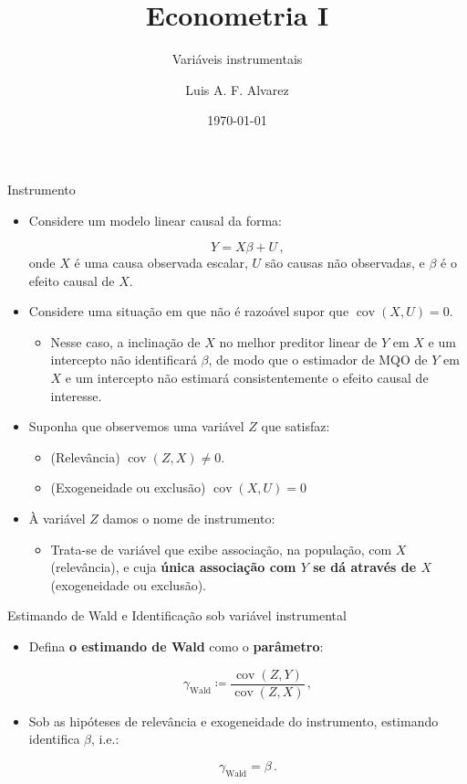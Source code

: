 \documentclass[11pt]{beamer}
\author{Luis A. F. Alvarez}
\title{Econometria I}
\subtitle{Variáveis instrumentais}
\date{\today}
\begin{document}
\begin{frame}[plain]
	\maketitle
\end{frame}
\begin{frame}{Instrumento}
	\begin{itemize}
		\item Considere um modelo linear {\color{blue}causal} da forma:
		
		$$Y = X\beta + U\, ,$$
		onde $X$ é uma causa observada escalar, $U$ são causas não observadas, e $\beta$ é o efeito causal de $X$.
		\item Considere uma situação em que não é razoável supor que $\operatorname{cov}(X,U) = 0$.
		\begin{itemize}
			\item Nesse caso, a inclinação de $X$ no melhor preditor linear de $Y$ em $X$ e um intercepto não identificará $\beta$, de modo que o estimador de MQO de $Y$ em $X$ e um intercepto não estimará consistentemente o efeito causal de interesse.  
		\end{itemize}
		\item Suponha que observemos uma variável $Z$ que satisfaz:
		\begin{itemize}
			\item (Relevância) $\operatorname{cov}(Z,X)\neq0$.
			\item (Exogeneidade ou exclusão)  $\operatorname{cov}(X,U)=0$
		\end{itemize}
		\item À variável $Z$ damos o nome de {\color{green}instrumento}:
		\begin{itemize}
			\item Trata-se de variável que exibe associação, na população, com $X$ (relevância), e cuja \textbf{única associação com $Y$ se dá através de $X$} (exogeneidade ou exclusão).
		\end{itemize}
\end{itemize}
	\end{frame}
\begin{frame}{Estimando de Wald e Identificação sob variável instrumental}
\begin{itemize}
	\item Defina  \textbf{o estimando de Wald} como o \textbf{parâmetro}:
	
	$$\gamma_{\text{Wald}}  \coloneqq \frac{\operatorname{cov}(Z,Y)}{\operatorname{cov}(Z,X)}\,,$$
	\item Sob as hipóteses de relevância e exogeneidade do instrumento, estimando identifica $\beta$, i.e.:
	
	$$\gamma_{\text{Wald}} = \beta\, .$$
\end{itemize}
\end{frame}
\end{document}
